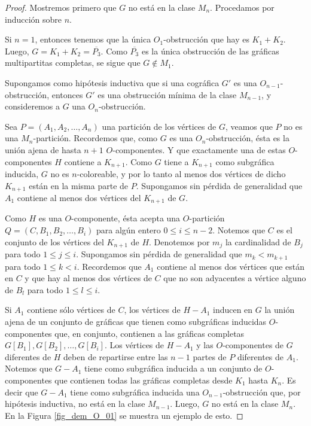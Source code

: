 \begin{proof}
Mostremos primero que $G$ no está en la clase $M_n$. Procedamos por inducción sobre $n$.

Si $n = 1$, entonces tenemos que la única $O_1$-obstrucción que hay es $K_1+K_2$. Luego, $G=K_1+K_2=\overline{P_3}$. Como $\overline{P_3}$ es la única obstrucción de las gráficas multipartitas completas, se sigue que $G\notin M_1$.

Supongamos como hipótesis inductiva que si una cográfica $G'$ es una $O_{n-1}$-obstrucción, entonces $G'$ es una obstrucción mínima de la clase $M_{n-1}$, y consideremos a $G$ una $O_n$-obstrucci\'on.

Sea $P = (A_1, A_2, \dots, A_n)$ una partición de los vértices de $G$, veamos que $P$ no es una $M_n$-partición. Recordemos que, como $G$ es una $O_n$-obstrucción, ésta es la unión ajena de hasta $n+1$ $O$-componentes. Y que exactamente una de estas $O$-componentes $H$ contiene a $K_{n+1}$. Como $G$ tiene a $K_{n+1}$ como subgráfica inducida, $G$ no es $n$-coloreable, y por lo tanto al menos dos vértices de dicho $K_{n+1}$ están en la misma parte de $P$. Supongamos sin pérdida de generalidad que $A_1$ contiene al menos dos vértices del $K_{n+1}$ de $G$.

Como $H$ es una $O$-componente, ésta acepta una $O$-partición $Q=(C,B_1,B_2,\dots,B_i)$ para algún entero $0\le i \le n-2$. Notemos que $C$ es el conjunto de los vértices del $K_{n+1}$ de $H$. Denotemos por $m_j$ la cardinalidad de $B_j$ para todo $1\le j\le i$. Supongamos sin pérdida de generalidad que $m_k < m_{k+1}$ para todo $1\le k < i$. Recordemos que $A_1$ contiene al menos dos vértices que están en $C$ y que hay al menos dos vértices de $C$ que no son adyacentes a vértice alguno de $B_l$ para todo $1\le l \le i$.

Si $A_1$ contiene sólo vértices de $C$, los vértices de $H-A_1$ inducen en $G$ la unión ajena de un conjunto de gráficas que tienen como subgráficas inducidas $O$-componentes que, en conjunto, contienen a las gráficas completas $G[B_1], G[B_2],\dots,G[B_i]$. Los vértices de $H-A_1$ y las $O$-componentes de $G$ diferentes de $H$ deben de repartirse entre las $n-1$ partes de $P$ diferentes de $A_1$. Notemos que $G-A_1$ tiene como subgráfica inducida a un conjunto de $O$-componentes que contienen todas las gráficas completas desde $K_1$ hasta $K_{n}$. Es decir que $G-A_1$ tiene como subgráfica inducida una $O_{n-1}$-obstrucción que, por hipótesis inductiva, no está en la clase $M_{n-1}$. Luego, $G$ no está en la clase $M_n$. En la Figura \ref{fig_dem_O_01} se muestra un ejemplo de esto.


\end{proof}
